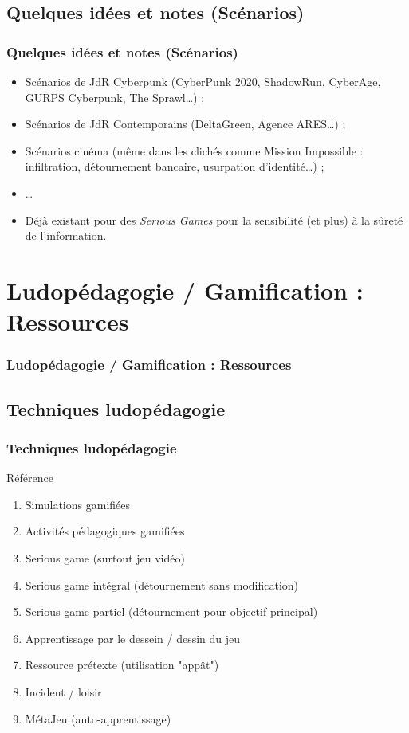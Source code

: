 \documentclass[slidetop,11pt]{beamer}
\begin{document}
\subsection{Quelques id{\'e}es et notes (Sc{\'e}narios)}
\begin{frame}
	\frametitle{Quelques id{\'e}es et notes (Sc{\'e}narios)}
	\begin{itemize}
		\item Sc{\'e}narios de JdR Cyberpunk (CyberPunk 2020, ShadowRun, CyberAge, GURPS Cyberpunk, The Sprawl\ldots) ; 
		\item Sc{\'e}narios de JdR Contemporains (DeltaGreen, Agence ARES\ldots) ; 
		\item Sc{\'e}narios cin{\'e}ma (m{\^e}me dans les clich{\'e}s comme Mission Impossible : infiltration, d{\'e}tournement bancaire, usurpation d'identit{\'e}\ldots) ; 
		\item \ldots
		\item D{\'e}j{\`a} existant pour des \emph{Serious Games} pour la sensibilit{\'e} (et plus) {\`a} la s{\^u}ret{\'e} de l'information. 
	\end{itemize}
\end{frame} 

\section{Ludop{\'e}dagogie / Gamification : Ressources}
\begin{frame}
	\frametitle{Ludop{\'e}dagogie / Gamification : Ressources}
	\tableofcontents[sections=3,currentsection,subsectionstyle=show/shaded/hide] %
\end{frame}

\subsection{Techniques ludop{\'e}dagogie}
\begin{frame}
	\frametitle{Techniques ludop{\'e}dagogie} %
	R{\'e}f{\'e}rence~\cite{9techniquesLudopedagogiques}
	\begin{enumerate}
		\item Simulations gamifi{\'e}es
		\item Activit{\'e}s p{\'e}dagogiques gamifi{\'e}es
		\item Serious game (surtout jeu vid{\'e}o)
		\item Serious game int{\'e}gral (d{\'e}tournement sans modification)
		\item Serious game partiel (d{\'e}tournement pour objectif principal)
		\item Apprentissage par le dessein / dessin du jeu
		\item Ressource pr{\'e}texte (utilisation "app{\^a}t")
		\item Incident / loisir
		\item M{\'e}taJeu (auto-apprentissage)
	\end{enumerate}
\end{frame} 
\end{document}
